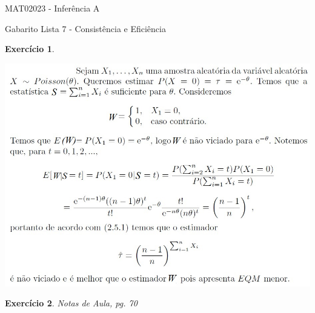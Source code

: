 \documentclass[letter,11pt]{article}
\newtheorem{exer}{Exercício}
\begin{document}
\begin{center}{ \Large MAT02023 - Inferência A }\end{center}

\begin{center}
{\large  \sc Gabarito Lista 7 - Consistência e Eficiência}
\end{center}
\vspace{5mm}

\begin{exer} \rm
\end{exer}
\includegraphics[scale=0.7]{gabarito_ex1_lista7.jpg}


\begin{exer} \rm
Notas de Aula, pg. 70
\end{exer}
\end{document}

